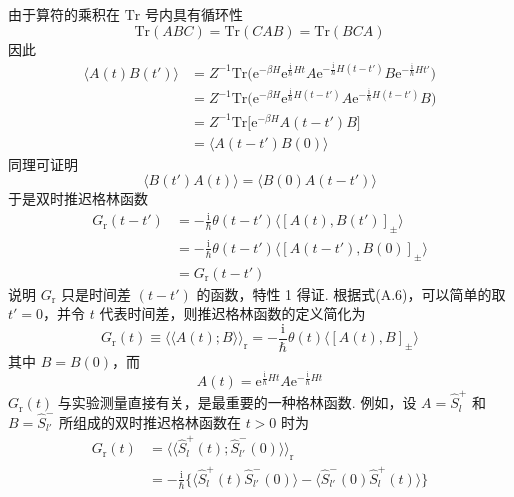 由于算符的乘积在 $\mathrm{Tr}$ 号内具有循环性
\begin{equation}
\mathrm{Tr}(ABC)=\mathrm{Tr}(CAB)=\mathrm{Tr}(BCA)
\end{equation}
因此
\begin{equation}
\begin{aligned}
\langle A(t)B(t')\rangle&=Z^{-1}\mathrm{Tr}
\bigl(\mathrm{e}^{-\beta H}\mathrm{e}^{\frac{\mathrm{i}}{\hbar}Ht}
A\mathrm{e}^{-\frac{\mathrm{i}}{\hbar}H(t-t')}
B\mathrm{e}^{-\frac{\mathrm{i}}{\hbar}Ht'}\bigr)\\
&=Z^{-1}\mathrm{Tr}\bigl(\mathrm{e}^{-\beta H}
\mathrm{e}^{\frac{\mathrm{i}}{\hbar}H(t-t')}
A\mathrm{e}^{-\frac{\mathrm{i}}{\hbar}H(t-t')}B\bigr)\\
&=Z^{-1}\mathrm{Tr}\bigl[\mathrm{e}^{-\beta H}A(t-t')B\bigr]\\
&=\langle A(t-t')B(0)\rangle
\end{aligned}
\end{equation}
同理可证明
\begin{equation}
\langle B(t')A(t)\rangle=\langle B(0)A(t-t')\rangle
\end{equation}
于是双时推迟格林函数
\begin{equation}
\begin{aligned}
G_{\mathrm{r}}(t-t')&=-\frac{\mathrm{i}}{\hbar}\theta(t-t')
\langle[A(t),B(t')]_{\pm}\rangle\\
&=-\frac{\mathrm{i}}{\hbar}\theta(t-t')
\langle[A(t-t'),B(0)]_{\pm}\rangle\\
&=G_{\mathrm{r}}(t-t')
\end{aligned}
\end{equation}
说明 $G_{\mathrm{r}}$ 只是时间差 $(t-t')$ 的函数，特性 1 得证. 根据式(A.6)，可以简单的取 $t'=0$，并令 $t$ 代表时间差，则推迟格林函数的定义简化为
\begin{equation}
G_{\mathrm{r}}(t)\equiv\langle\langle A(t);B\rangle\rangle_{\mathrm{r}}
=-\frac{\mathrm{i}}{\hbar}\theta(t)\langle[A(t),B]_{\pm}\rangle
\end{equation}
其中 $B=B(0)$，而
\begin{equation}
A(t)=\mathrm{e}^{\frac{\mathrm{i}}{\hbar}Ht}
A\mathrm{e}^{-\frac{\mathrm{i}}{\hbar}Ht}
\end{equation}
$G_{\mathrm{r}}(t)$ 与实验测量直接有关，是最重要的一种格林函数. 例如，设 $A=\hat{S}_{l}^{+}$ 和 $B=\hat{S}_{l'}^{-}$ 所组成的双时推迟格林函数在 $t>0$ 时为
\begin{equation*}
\begin{aligned}
G_{\mathrm{r}}(t)&=\langle\langle\hat{S}_{l}^{+}(t);
\hat{S}_{l'}^{-}(0)\rangle\rangle_{\mathrm{r}}\\
&=-\frac{\mathrm{i}}{\hbar}\bigl\{\langle\hat{S}_{l}^{+}(t)
\hat{S}_{l'}^{-}(0)\rangle
-\langle\hat{S}_{l'}^{-}(0)\hat{S}_{l}^{+}(t)\rangle\bigr\}
\end{aligned}
\end{equation*}
